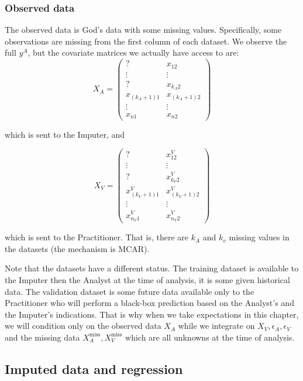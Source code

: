 			\subsubsection{Observed data}
The observed data is God's data with some missing values. Specifically, some observations are missing from the first column of each dataset.  We observe the full $y^A$, but the covariate matrices we actually have access to are:
\begin{equation*}
X_A = 
\begin{pmatrix}
? & x_{12} \\
\vdots & \vdots \\
? & x_{k_A2} \\
x_{(k_A+1)1} & x_{(k_A+1)2}\\
\vdots & \vdots \\
x_{n1} & x_{n2}
\end{pmatrix}
\end{equation*}

which is sent to the Imputer, and

\begin{equation*}
X_V = 
\begin{pmatrix}
? & x_{12}^V \\
\vdots & \vdots \\
? & x_{k_V 2}^V \\
x_{(k_V+1)1}^V & x_{(k_V+1)2}^V\\
\vdots & \vdots \\
x_{n_V 1}^V & x_{n_V 2}^V
\end{pmatrix}
\end{equation*}

which is sent to the Practitioner. That is, there are $k_A$ and $k_v$ missing values in the datasets (the mechanism is MCAR).

Note that the datasets have a different status. The training dataset is available to the Imputer then the Analyst at the time of analysis, it is some given historical data. The validation dataset is some future data available only to the Practitioner who will perform a black-box prediction based on the Analyst's and the Imputer's indications. That is why when we take expectations in this chapter, we will condition only on the observed data $X_A$ while we integrate on $X_V, \epsilon_A, \epsilon_V$ and the missing data $X_A^{\text{miss}}, X_V^{\text{miss}}$ which are all unknowns at the time of analysis. 

		\subsection{Imputed data and regression}
